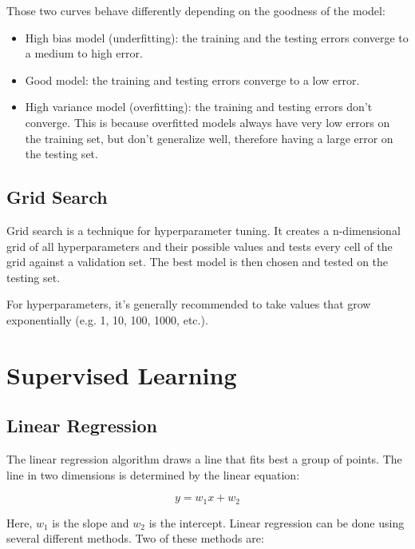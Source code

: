 \documentclass{article}
\begin{document}
Those two curves behave differently depending on the goodness of the model:

\begin{itemize}
  \item High bias model (underfitting): the training and the testing errors converge to a medium to high error.
  \item Good model: the training and testing errors converge to a low error.
  \item High variance model (overfitting): the training and testing errors don’t converge. This is because overfitted models always have very low errors on the training set, but don’t generalize well, therefore having a large error on the testing set.
\end{itemize}

\subsection{Grid Search}
Grid search is a technique for hyperparameter tuning. It creates a n-dimensional grid of all hyperparameters and their possible values and tests every cell of the grid against a validation set. The best model is then chosen and tested on the testing set.

For hyperparameters, it’s generally recommended to take values that grow exponentially (e.g. 1, 10, 100, 1000, etc.).

\section{Supervised Learning}
\subsection{Linear Regression}
The linear regression algorithm draws a line that fits best a group of points. The line in two dimensions is determined by the linear equation:

\begin{equation}
  y = w_1 x + w_2
\end{equation}

Here, $w_1$ is the slope and $w_2$ is the intercept. Linear regression can be done using several different methods. Two of these methods are:
\end{document}
